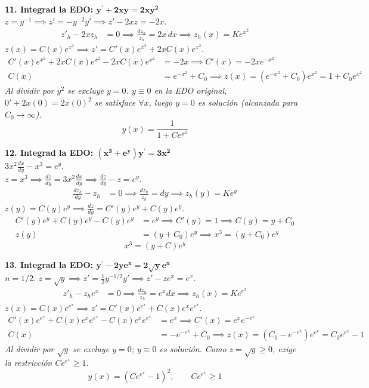 \documentclass[11pt, a4paper]{article}
\begin{document}
\noindent\textbf{11. Integrad la EDO: $\bm{y^{\prime}+2xy=2xy^{2}}$} \\
$z = y^{-1} \implies z' = -y^{-2}y' \implies z' - 2xz = -2x$. \\
\begin{align*}
z'_h - 2xz_h &= 0 \implies \frac{dz_h}{z_h} = 2x\,dx \implies z_h(x) = K e^{x^2}
\end{align*}
$z(x) = C(x)e^{x^2} \implies z' = C'(x)e^{x^2} + 2xC(x)e^{x^2}$. \\
\begin{align*}
C'(x)e^{x^2} + 2xC(x)e^{x^2} - 2xC(x)e^{x^2} &= -2x \implies C'(x) = -2x e^{-x^2} \\
C(x) &= e^{-x^2} + C_0 \implies z(x) = (e^{-x^2} + C_0)e^{x^2} = 1 + C_0 e^{x^2}
\end{align*}
\textit{Al dividir por $y^2$ se excluye $y=0$. $y\equiv 0$ en la EDO original, $0' + 2x(0) = 2x(0)^2$ se satisface $\forall x$, luego $y=0$ es solución (alcanzada para $C_0 \to \infty$).}
\[
\boxed{y(x) = \frac{1}{1 + C e^{x^2}}}
\]


\noindent\textbf{12. Integrad la EDO: $\bm{(x^{3}+e^{y})y^{\prime}=3x^{2}}$} \\
$3x^2 \frac{dx}{dy} - x^3 = e^y$. \\
$z = x^3 \implies \frac{dz}{dy} = 3x^2 \frac{dx}{dy} \implies \frac{dz}{dy} - z = e^y$. \\
\begin{align*}
\frac{dz_h}{dy} - z_h &= 0 \implies \frac{dz_h}{z_h} = dy \implies z_h(y) = K e^y
\end{align*}
$z(y) = C(y)e^y \implies \frac{dz}{dy} = C'(y)e^y + C(y)e^y$. \\
\begin{align*}
C'(y)e^y + C(y)e^y - C(y)e^y &= e^y \implies C'(y) = 1 \implies C(y) = y + C_0 \\
z(y) &= (y + C_0)e^y \implies x^3 = (y + C_0)e^y
\end{align*}
\[
\boxed{x^3 = (y+C)e^y}
\]

\noindent\textbf{13. Integrad la EDO: $\bm{y^{\prime}-2ye^{x}=2\sqrt{y}e^{x}}$} \\
$n=1/2$. $z = \sqrt{y} \implies z' = \frac{1}{2}y^{-1/2}y' \implies z' - z e^x = e^x$. \\
\begin{align*}
z'_h - z_h e^x &= 0 \implies \frac{dz_h}{z_h} = e^x dx \implies z_h(x) = K e^{e^x}
\end{align*}
$z(x) = C(x)e^{e^x} \implies z' = C'(x)e^{e^x} + C(x)e^x e^{e^x}$. \\
\begin{align*}
C'(x)e^{e^x} + C(x)e^x e^{e^x} - C(x)e^x e^{e^x} &= e^x \implies C'(x) = e^x e^{-e^x} \\
C(x) &= -e^{-e^x} + C_0 \implies z(x) = (C_0 - e^{-e^x})e^{e^x} = C_0 e^{e^x} - 1
\end{align*}
\textit{Al dividir por $\sqrt{y}$ se excluye $y=0$; $y\equiv 0$ es solución. Como $z = \sqrt{y} \geq 0$, exige la restricción $C e^{e^x} \geq 1$.}
\[
\boxed{y(x) = \left(C e^{e^x} - 1\right)^2, \qquad C e^{e^x} \geq 1}
\]
\end{document}
